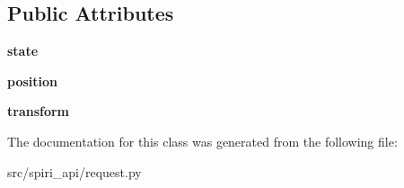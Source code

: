 \subsection*{Public Attributes}
\begin{DoxyCompactItemize}
\item 
\hypertarget{classspiri__api_1_1request_1_1_staterobot_a4563ac2f792773f2aa0f1f13a8cf5775}{{\bfseries state}}\label{classspiri__api_1_1request_1_1_staterobot_a4563ac2f792773f2aa0f1f13a8cf5775}

\item 
\hypertarget{classspiri__api_1_1request_1_1_staterobot_abc658b440d8298da195c28649fce4caa}{{\bfseries position}}\label{classspiri__api_1_1request_1_1_staterobot_abc658b440d8298da195c28649fce4caa}

\item 
\hypertarget{classspiri__api_1_1request_1_1_staterobot_a50abf0b8a4bd9a8590b772a44fca758e}{{\bfseries transform}}\label{classspiri__api_1_1request_1_1_staterobot_a50abf0b8a4bd9a8590b772a44fca758e}

\end{DoxyCompactItemize}


The documentation for this class was generated from the following file\-:\begin{DoxyCompactItemize}
\item 
src/spiri\-\_\-api/request.\-py\end{DoxyCompactItemize}
